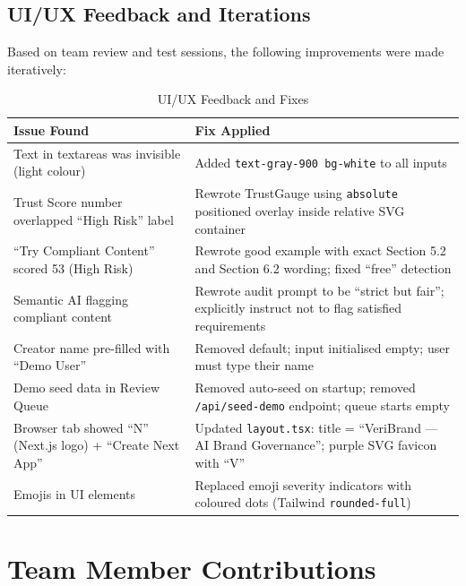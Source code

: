 \documentclass[11pt,a4paper]{article}
\begin{document}
\subsection{UI/UX Feedback and Iterations}

Based on team review and test sessions, the following improvements were made iteratively:

\begin{table}[H]
\centering
\begin{tabular}{p{} p{}}
\toprule
\textbf{Issue Found} & \textbf{Fix Applied} \\
\midrule
Text in textareas was invisible (light colour) & Added \texttt{text-gray-900 bg-white} to all inputs \\
\addlinespace
Trust Score number overlapped ``High Risk'' label & Rewrote TrustGauge using \texttt{absolute} positioned overlay inside relative SVG container \\
\addlinespace
``Try Compliant Content'' scored 53 (High Risk) & Rewrote good example with exact Section 5.2 and Section 6.2 wording; fixed ``free'' detection \\
\addlinespace
Semantic AI flagging compliant content & Rewrote audit prompt to be ``strict but fair''; explicitly instruct not to flag satisfied requirements \\
\addlinespace
Creator name pre-filled with ``Demo User'' & Removed default; input initialised empty; user must type their name \\
\addlinespace
Demo seed data in Review Queue & Removed auto-seed on startup; removed \texttt{/api/seed-demo} endpoint; queue starts empty \\
\addlinespace
Browser tab showed ``N'' (Next.js logo) + ``Create Next App'' & Updated \texttt{layout.tsx}: title = ``VeriBrand --- AI Brand Governance''; purple SVG favicon with ``V'' \\
\addlinespace
Emojis in UI elements & Replaced emoji severity indicators with coloured dots (Tailwind \texttt{rounded-full}) \\
\bottomrule
\end{tabular}
\caption{UI/UX Feedback and Fixes}
\end{table}

\section{Team Member Contributions}
\end{document}
